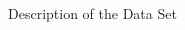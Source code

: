 \begin{frame}{Description of the Data Set}
\begin{columns}[T]
\begin{column}{0.6\textwidth}
\begin{figure}
            \end{figure}
        \end{column}
    \end{columns}
\end{frame}